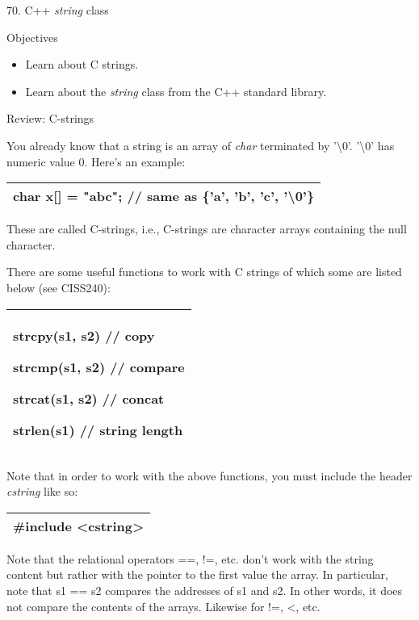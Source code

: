 \documentclass[
]{article}
\author{}
\date{}
\providecommand{\tightlist}{%
  \setlength{\itemsep}{0pt}\setlength{\parskip}{0pt}}
\begin{document}
70. C++ \emph{string} class

Objectives

\begin{itemize}
\tightlist
\item
  Learn about C strings.
\item
  Learn about the \emph{string} class from the C++ standard library.
\end{itemize}

Review: C-strings

You already know that a string is an array of \emph{char} terminated by
'\textbackslash0'. '\textbackslash0' has numeric value 0. Here's an
example:

\begin{longtable}[]{@{}l@{}}
\toprule
\endhead
char x{[}{]} = "abc"; // same as \{'a', 'b', 'c',
'\textbackslash0'\}\tabularnewline
\bottomrule
\end{longtable}

These are called C-strings, i.e., C-strings are character arrays
containing the null character.

There are some useful functions to work with C strings of which some are
listed below (see CISS240):

\begin{longtable}[]{@{}l@{}}
\toprule
\endhead
\begin{minipage}[t]{0.97\columnwidth}\raggedright
strcpy(s1, s2) // copy

strcmp(s1, s2) // compare

strcat(s1, s2) // concat

strlen(s1) // string length\strut
\end{minipage}\tabularnewline
\bottomrule
\end{longtable}

Note that in order to work with the above functions, you must include
the header \emph{cstring} like so:

\begin{longtable}[]{@{}l@{}}
\toprule
\endhead
\#include \textless cstring\textgreater{}\tabularnewline
\bottomrule
\end{longtable}

Note that the relational operators ==, !=, etc. don't work with the
string content but rather with the pointer to the first value the array.
In particular, note that s1 == s2 compares the addresses of s1 and s2.
In other words, it does not compare the contents of the arrays. Likewise
for !=, \textless, etc.
\end{document}
